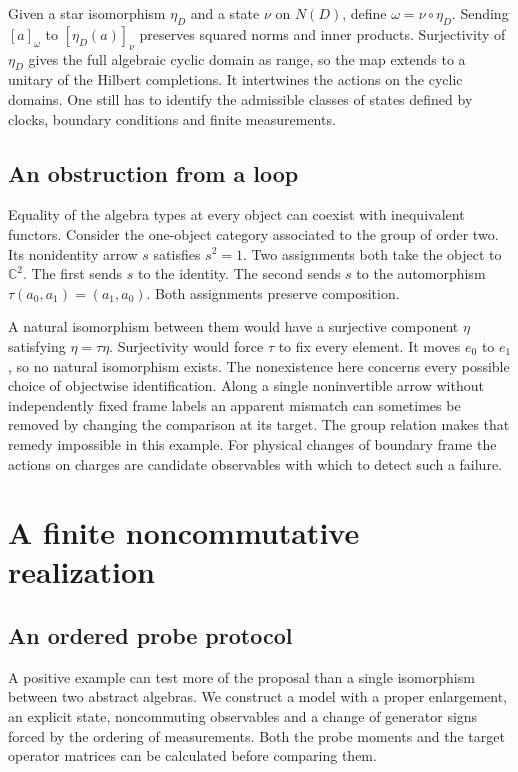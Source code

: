 \documentclass[11pt,letterpaper]{article}
\begin{document}
Given a star isomorphism $\eta_D$ and a state $\nu$ on $N(D)$, define $\omega=\nu\circ\eta_D$. Sending $[a]_\omega$ to $[\eta_D(a)]_\nu$ preserves squared norms and inner products. Surjectivity of $\eta_D$ gives the full algebraic cyclic domain as range, so the map extends to a unitary of the Hilbert completions. It intertwines the actions on the cyclic domains. One still has to identify the admissible classes of states defined by clocks, boundary conditions and finite measurements.

\subsection{An obstruction from a loop}

Equality of the algebra types at every object can coexist with inequivalent functors. Consider the one-object category associated to the group of order two. Its nonidentity arrow $s$ satisfies $s^2=1$. Two assignments both take the object to $\mathbb C^2$. The first sends $s$ to the identity. The second sends $s$ to the automorphism $\tau(a_0,a_1)=(a_1,a_0)$. Both assignments preserve composition.

A natural isomorphism between them would have a surjective component $\eta$ satisfying $\eta=\tau\eta$. Surjectivity would force $\tau$ to fix every element. It moves $e_0$ to $e_1$, so no natural isomorphism exists. The nonexistence here concerns every possible choice of objectwise identification. Along a single noninvertible arrow without independently fixed frame labels an apparent mismatch can sometimes be removed by changing the comparison at its target. The group relation makes that remedy impossible in this example. For physical changes of boundary frame the actions on charges are candidate observables with which to detect such a failure.

\section{A finite noncommutative realization}
\label{sec:finite}

\subsection{An ordered probe protocol}

A positive example can test more of the proposal than a single isomorphism between two abstract algebras. We construct a model with a proper enlargement, an explicit state, noncommuting observables and a change of generator signs forced by the ordering of measurements. Both the probe moments and the target operator matrices can be calculated before comparing them.
\end{document}
